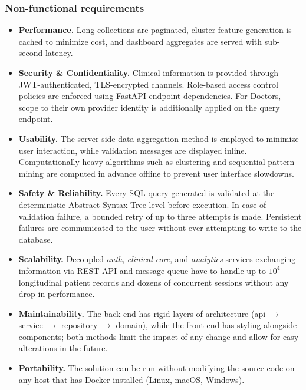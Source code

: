 \subsubsection*{Non-functional requirements}
\begin{itemize}
    \item \textbf{Performance.} Long collections are paginated, cluster feature generation is cached to minimize cost, and dashboard aggregates are served with sub-second latency.
    \item \textbf{Security \& Confidentiality.} Clinical information is provided through JWT-authenticated, TLS-encrypted channels. Role-based access control policies are enforced using FastAPI endpoint dependencies. For Doctors, scope to their own provider identity is additionally applied on the query endpoint.
    \item \textbf{Usability.} The server-side data aggregation method is employed to minimize user interaction, while validation messages are displayed inline. Computationally heavy algorithms such as clustering and sequential pattern mining are computed in advance offline to prevent user interface slowdowns.
    \item \textbf{Safety \& Reliability.} Every SQL query generated is validated at the deterministic Abstract Syntax Tree level before execution. In case of validation failure, a bounded retry of up to three attempts is made. Persistent failures are communicated to the user without ever attempting to write to the database.
    \item \textbf{Scalability.} Decoupled \emph{auth}, \emph{clinical-core}, and \emph{analytics} services exchanging information via REST API and message queue have to handle up to $10^{4}$ longitudinal patient records and dozens of concurrent sessions without any drop in performance.
    \item \textbf{Maintainability.} The back-end has rigid layers of architecture (api $\rightarrow$ service $\rightarrow$ repository $\rightarrow$ domain), while the front-end has styling alongside components; both methods limit the impact of any change and allow for easy alterations in the future.
    \item \textbf{Portability.} The solution can be run without modifying the source code on any host that has Docker installed (Linux, macOS, Windows).
\end{itemize}